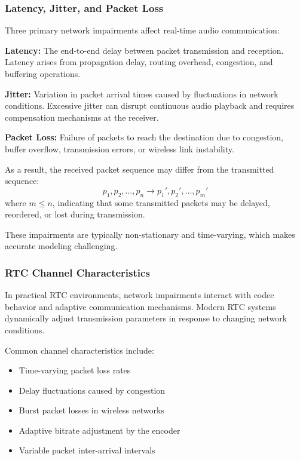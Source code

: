 \subsubsection{Latency, Jitter, and Packet Loss}

Three primary network impairments affect real-time audio communication:

\textbf{Latency:} The end-to-end delay between packet transmission and reception. Latency arises from propagation delay, routing overhead, congestion, and buffering operations.

\textbf{Jitter:} Variation in packet arrival times caused by fluctuations in network conditions. Excessive jitter can disrupt continuous audio playback and requires compensation mechanisms at the receiver.

\textbf{Packet Loss:} Failure of packets to reach the destination due to congestion, buffer overflow, transmission errors, or wireless link instability.

As a result, the received packet sequence may differ from the transmitted sequence:
\begin{equation}
{p_1,p_2,\ldots,p_n}
\rightarrow
{p_1',p_2',\ldots,p_m'}
\label{eq:packet_loss_model}
\end{equation}
where $m \leq n$, indicating that some transmitted packets may be delayed, reordered, or lost during transmission.

These impairments are typically non-stationary and time-varying, which makes accurate modeling challenging.

\subsubsection{RTC Channel Characteristics}

In practical RTC environments, network impairments interact with codec behavior and adaptive communication mechanisms. Modern RTC systems dynamically adjust transmission parameters in response to changing network conditions.

Common channel characteristics include:

\begin{itemize}
\item Time-varying packet loss rates
\item Delay fluctuations caused by congestion
\item Burst packet losses in wireless networks
\item Adaptive bitrate adjustment by the encoder
\item Variable packet inter-arrival intervals
\end{itemize}

